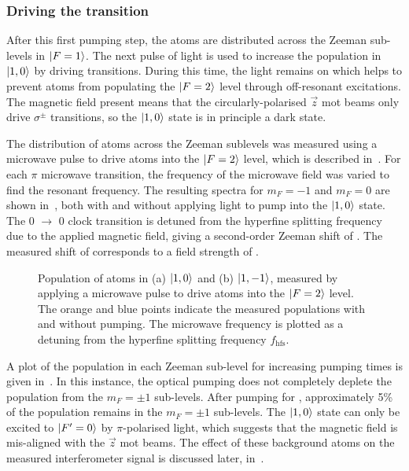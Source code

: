 \subsubsection{Driving the  transition}
After this first pumping step, the atoms are distributed across the Zeeman sub-levels in \(\ket{F=1}\). The next pulse of light is used to increase the population in \(\ket{1,0}\) by driving  transitions. During this time, the  light remains on which helps to prevent atoms from populating the \(\ket{F=2}\) level through off-resonant  excitations. The magnetic field present means that the circularly-polarised \(\vec{z}\) \ac{mot} beams only drive \(\sigma^{\pm}\) transitions, so the \(\ket{1,0}\) state is in principle a dark state. 
\par\noindent
The distribution of atoms across the Zeeman sublevels was measured using a microwave pulse to drive atoms into the \(\ket{F=2}\) level, which is described in~. For each \(\pi\) microwave transition, the frequency of the microwave field was varied to find the resonant frequency. The resulting spectra for \(m_F = -1\)  and \(m_F = 0\) are shown in~, both with and without applying light to pump into the \(\ket{1,0}\) state.  The 0 \(\rightarrow\) 0 clock transition is detuned from the hyperfine splitting frequency due to the applied magnetic field, giving a second-order Zeeman shift of . The measured shift of  corresponds to a field strength of .
\begin{figure}[!htbp]
    \centering
    \def\svgwidth{\columnwidth}
    \caption[\(m_F\) populations before and after  pumping]{Population of atoms in (a) \(\ket{1,0}\) and (b) \(\ket{1,-1}\), measured by applying a  microwave pulse to drive atoms into the \(\ket{F=2}\) level. The orange and blue points indicate the measured populations with and without  pumping. The microwave frequency is plotted as a detuning from the hyperfine splitting frequency \(f_\text{hfs}\).}
    \label{fig:step2_microwave_spec}
\end{figure} 
\par\noindent
A plot of the population in each Zeeman sub-level for increasing pumping times is given in~. In this instance, the optical pumping does not completely deplete the population from the \(m_F = \pm 1\) sub-levels. After pumping for , approximately 5\% of the population remains in the \(m_F = \pm 1\) sub-levels. The \(\ket{1,0}\) state can only be excited to \(\ket{F'=0}\) by \(\pi\)-polarised light, which suggests that the magnetic field is mis-aligned with the \(\vec{z}\) \ac{mot} beams. The effect of these background atoms on the measured interferometer signal is discussed later, in~.
